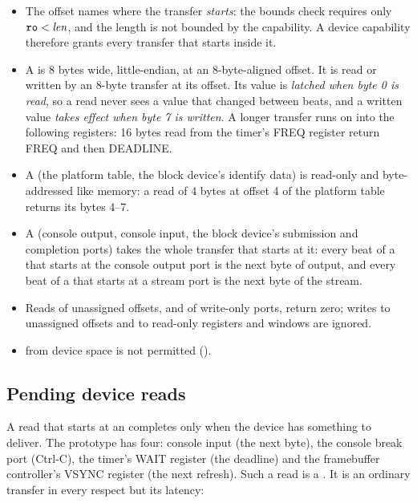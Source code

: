 \begin{itemize}
\item The offset names where the transfer \emph{starts}: the bounds check requires only
  $\texttt{ro} < \textit{len}$, and the length is not bounded by the capability. A device capability
  therefore grants every transfer that starts inside it.
\item A  is 8 bytes wide, little-endian, at an 8-byte-aligned offset. It is read or
  written by an 8-byte transfer at its offset. Its value is \emph{latched when byte 0 is read}, so a read
  never sees a value that changed between beats, and a written value \emph{takes effect when byte 7 is
  written}. A longer transfer runs on into the following registers: 16 bytes read from the timer's FREQ
  register return FREQ and then DEADLINE.
\item A  (the platform table, the block device's identify data) is read-only and
  byte-addressed like memory: a read of 4 bytes at offset 4 of the platform table returns its bytes
  4--7.
\item A  (console output, console input, the block device's submission and completion
  ports) takes the whole transfer that starts at it: every beat of a  that starts at the
  console output port is the next byte of output, and every beat of a  that starts at a stream
  port is the next byte of the stream.
\item Reads of unassigned offsets, and of write-only ports, return zero; writes to unassigned offsets
  and to read-only registers and windows are ignored.
\item {} from device space is not permitted ().
\end{itemize}

\subsection{Pending device reads}\label{sec:pendread}

A read that starts at an  completes only when the device has something to deliver.
The prototype has four: console input (the next byte), the console break port (Ctrl-C), the timer's
WAIT register (the deadline) and the framebuffer controller's VSYNC register (the next refresh). Such a
read is a . It is an ordinary transfer in every respect but its latency:

